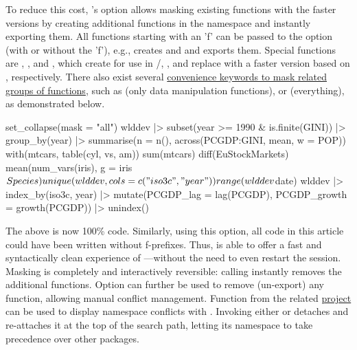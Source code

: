 \documentclass[nojss]{jss} %
\newcommand{\fct}[1]{\code{#1()}}
\begin{document}
To reduce this cost, 's  option allows masking existing  functions with the faster  versions by creating additional functions in the namespace and instantly exporting them. All  functions starting with an 'f' can be passed to the option (with or without the 'f'), e.g.,  creates  and  and exports them. Special functions are , , and , which create  for use in /, , and replace  with a faster version based on \fct{fmatch}, respectively. There also exist several \href{https://sebkrantz.github.io/collapse/reference/collapse-options.html}{convenience keywords to mask related groups of functions}, such as  (only data manipulation functions), or  (everything), as demonstrated below.
%
\begin{Code}
set_collapse(mask = "all")
wlddev |> subset(year >= 1990 & is.finite(GINI)) |>
  group_by(year) |>
  summarise(n = n(), across(PCGDP:GINI, mean, w = POP))
with(mtcars, table(cyl, vs, am))
sum(mtcars)
diff(EuStockMarkets)
mean(num_vars(iris), g = iris$Species)
unique(wlddev, cols = c("iso3c", "year"))
range(wlddev$date)
wlddev |> index_by(iso3c, year) |>
  mutate(PCGDP_lag = lag(PCGDP),
         PCGDP_growth = growth(PCGDP)) |> unindex()
\end{Code}
%
The above is now 100\%  code. Similarly, using this option, all code in this article could have been written without f-prefixes. Thus,  is able to offer a fast and syntactically clean experience of ---without the need to even restart the session. Masking is completely and interactively reversible: calling  instantly removes the additional functions. Option  can further be used to remove (un-export) any  function, allowing manual conflict management. Function  from the related \href{https://fastverse.github.io/fastverse/}{ project} \citep{rfastverse} can be used to display namespace conflicts with . Invoking either  or  detaches  and re-attaches it at the top of the search path, letting its namespace to take precedence over other packages. \newline
\end{document}

